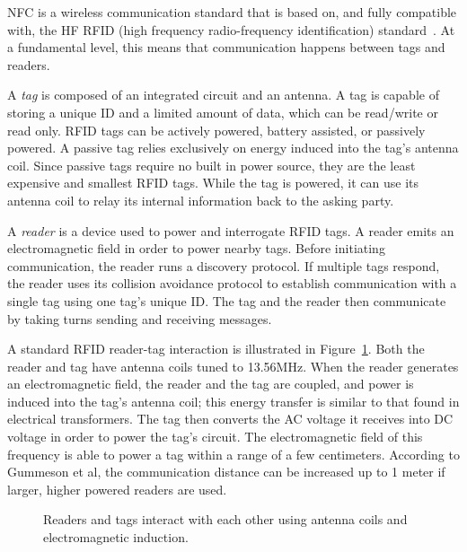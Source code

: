 \documentclass{sig-alternate}
\begin{document}
NFC is a wireless communication standard that is based on, and fully compatible with, the HF RFID (high frequency radio-frequency identification) standard~\cite{Gum2013}. At a fundamental level, this means that communication happens between tags and readers.

A \textit{tag} is composed of an integrated circuit and an antenna. A tag is capable of storing a unique ID and a limited amount of data, which can be read/write or read only. RFID tags can be actively powered, battery assisted, or passively powered. A passive tag relies exclusively on energy induced into the tag's antenna coil. Since passive tags require no built in power source, they are the least expensive and smallest RFID tags. While the tag is powered, it can use its antenna coil to relay its internal information back to the asking party.~\cite{wiki:RFID}

A \textit{reader} is a device used to power and interrogate RFID tags. A reader emits an electromagnetic field in order to power nearby tags. Before initiating communication, the reader runs a discovery protocol. If multiple tags respond, the reader uses its collision avoidance protocol to establish communication with a single tag using one tag's unique ID. The tag and the reader then communicate by taking turns sending and receiving messages.~\cite{Gum2013}

A standard RFID reader-tag interaction is illustrated in Figure~\ref{fig:rfid}. Both the reader and tag have antenna coils tuned to 13.56MHz. When the reader generates an electromagnetic field, the reader and the tag are coupled, and power is induced into the tag's antenna coil; this energy transfer is similar to that found in electrical transformers. The tag then converts the AC voltage it receives into DC voltage in order to power the tag's circuit. The electromagnetic field of this frequency is able to power a tag within a range of a few centimeters. According to Gummeson et al, the communication distance can be increased up to 1 meter if larger, higher powered readers are used.~\cite{Gum2013}


\begin{figure}
\centering
{}
\caption{Readers and tags interact with each other using antenna coils and electromagnetic induction.}
\label{fig:rfid}
\end{figure}
\end{document}
